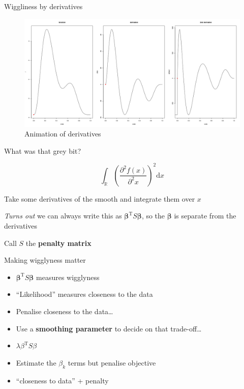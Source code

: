\documentclass[10pt,ignorenonframetext,compress, aspectratio=169]{beamer}
\providecommand{\tightlist}{%
  \setlength{\itemsep}{0pt}\setlength{\parskip}{0pt}}
\begin{document}
\begin{frame}{Wiggliness by derivatives}

\begin{figure}[htbp]
\centering
\includegraphics{wiggly.gif}
\caption{Animation of derivatives}
\end{figure}

\end{frame}

\begin{frame}{What was that grey bit?}

\[
\int_\mathbb{R} \left( \frac{\partial^2 f(x)}{\partial^2 x}\right)^2 \text{d}x
\]

Take some derivatives of the smooth and integrate them over \(x\)

\emph{Turns out} we can always write this as
\(\boldsymbol{\beta}^{\text{T}}S\boldsymbol{\beta}\), so the
\(\boldsymbol{\beta}\) is separate from the derivatives

Call \(S\) the \textbf{penalty matrix}

\end{frame}

\begin{frame}{Making wigglyness matter}

\begin{itemize}
\tightlist
\item
  \(\boldsymbol{\beta}^\text{T}S\boldsymbol{\beta}\) measures wigglyness
\item
  ``Likelihood'' measures closeness to the data
\item
  Penalise closeness to the data\ldots{}
\item
  Use a \textbf{smoothing parameter} to decide on that trade-off\ldots{}
\item
  \(\lambda \beta^\text{T}S\beta\)
\item
  Estimate the \(\beta_k\) terms but penalise objective
\item
  ``closeness to data'' + penalty
\end{itemize}

\end{frame}
\end{document}
